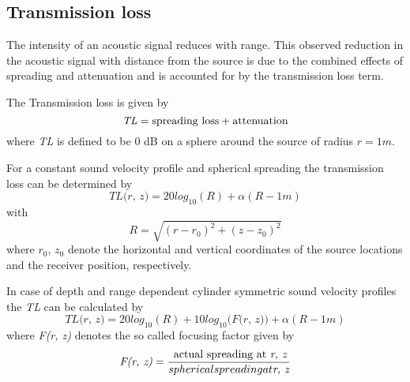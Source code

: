\subsection{ Transmission loss } \label{ Transmission loss }
\noindent The intensity of an acoustic signal reduces with range. This observed reduction in the acoustic signal with distance from the source is due to the combined effects of spreading and attenuation and is accounted for by the transmission loss term.

\noindent The Transmission loss is given by
\begin{equation}
\textit{TL} = \textnormal{spreading loss} + \textnormal{attenuation} 
\end{equation}
\noindent where \textit{TL} is defined to be 0 dB on a sphere around the source of radius $\textit{r} = 1m.$

\noindent For a constant sound velocity profile and spherical spreading the transmission loss can be determined by
\begin{equation}
\textit{TL(r, z)} = 20 log_{10}{(R)} + \alpha (\textit{R} - 1m)
\end{equation}
\noindent with
\begin{equation}
\textit{R} = \sqrt{ (\textit{r} - \textit{$r_{0}$})^{2} + (\textit{z} - \textit{$z_{0}$})^{2} }
\end{equation}
\noindent where \textit{$r_{0}$}, \textit{$z_{0}$} denote the horizontal and vertical coordinates of the source locations and the receiver position, respectively.

\noindent In case of depth and range dependent cylinder symmetric sound velocity profiles the \textit{TL} can be calculated by
\begin{equation}
\textit{TL(r, z)} = 20 log_{10}{(R)} + 10log_{10}{(\textit{F(r, z))}}  + \alpha (\textit{R} - 1m)
\end{equation}
\noindent where \textit{F(r, z)} denotes the so called focusing factor given by
\begin{equation}
\textit{F(r, z)} = \frac{ \textnormal{ actual spreading at \textit{r, z}}}{ spherical spreading at \textit{r, z}}
\end{equation}
